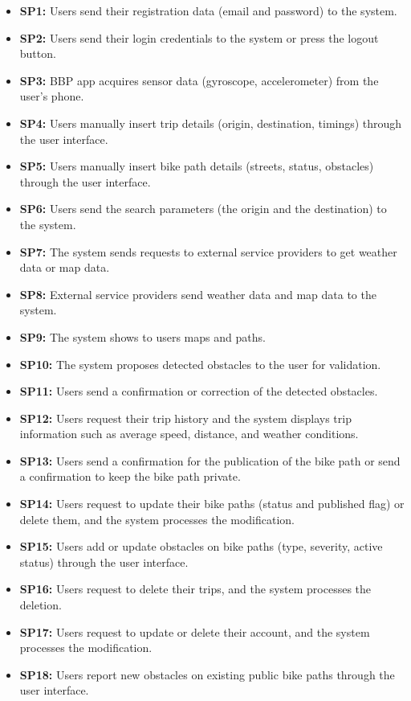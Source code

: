 \begin{itemize}
\item[] \textbf{SP1:} Users send their registration data (email and password) to the system.
\item[] \textbf{SP2:} Users send their login credentials to the system or press the logout button.
\item[] \textbf{SP3:} BBP app acquires sensor data (gyroscope, accelerometer) from the user's phone.
\item[] \textbf{SP4:} Users manually insert trip details (origin, destination, timings) through the user interface.
\item[] \textbf{SP5:} Users manually insert bike path details (streets, status, obstacles) through the user interface.
\item[] \textbf{SP6:} Users send the search parameters (the origin and the destination) to the system.
\item[] \textbf{SP7:} The system sends requests to external service providers to get weather data or map data.
\item[] \textbf{SP8:} External service providers send weather data and map data to the system.
\item[] \textbf{SP9:} The system shows to users maps and paths.
\item[] \textbf{SP10:} The system proposes detected obstacles to the user for validation.
\item[] \textbf{SP11:} Users send a confirmation or correction of the detected obstacles.
\item[] \textbf{SP12:} Users request their trip history and the system displays trip information such as average speed, distance, and weather conditions.
\item[] \textbf{SP13:} Users send a confirmation for the publication of the bike path or send a confirmation to keep the bike path private.
\item[] \textbf{SP14:} Users request to update their bike paths (status and published flag) or delete them, and the system processes the modification.
\item[] \textbf{SP15:} Users add or update obstacles on bike paths (type, severity, active status) through the user interface.
\item[] \textbf{SP16:} Users request to delete their trips, and the system processes the deletion.
\item[] \textbf{SP17:} Users request to update or delete their account, and the system processes the modification.
\item[] \textbf{SP18:} Users report new obstacles on existing public bike paths through the user interface.
\end{itemize}

